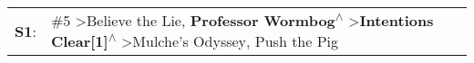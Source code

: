 \begin{supertabular}{p{0.03\textwidth}p{0.92\textwidth}}
 \textbf{S1}:  &  \#5\textsuperscript{} \textgreater \enspace Believe the Lie\textsuperscript{}, \enspace \textbf{Professor Wormbog\textsuperscript{$\wedge$}} \textgreater \enspace \textbf{Intentions Clear[1]\textsuperscript{$\wedge$}} \textgreater \enspace Mulche's Odyssey\textsuperscript{}, \enspace Push the Pig\textsuperscript{}  \enspace  \\
\end{supertabular}
